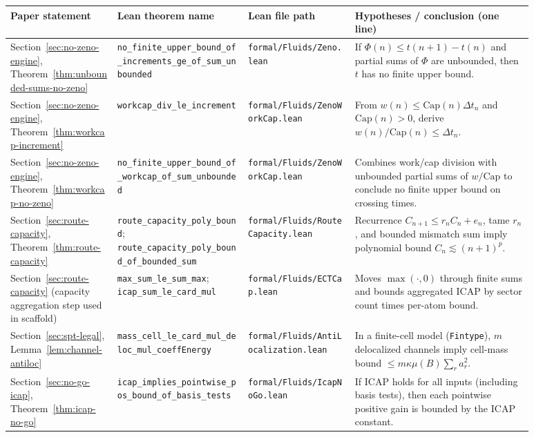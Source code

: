 \documentclass[11pt]{article}
\begin{document}
\begin{table}[H]
\centering
\footnotesize
\renewcommand{\arraystretch}{1.15}
\setlength{\tabcolsep}{4pt}
\begin{tabular}{>{\raggedright\arraybackslash}p{0.18\linewidth}
                >{\raggedright\arraybackslash}p{0.22\linewidth}
                >{\raggedright\arraybackslash}p{0.18\linewidth}
                >{\raggedright\arraybackslash}p{0.30\linewidth}}
\toprule
\textbf{Paper statement} & \textbf{Lean theorem name} & \textbf{Lean file path} & \textbf{Hypotheses / conclusion (one line)} \\
\midrule
Section~\ref{sec:no-zeno-engine}, Theorem~\ref{thm:unbounded-sums-no-zeno}
& \nolinkurl{no_finite_upper_bound_of_increments_ge_of_sum_unbounded}
& \nolinkurl{formal/Fluids/Zeno.lean}
& If \(\Phi(n)\le t(n+1)-t(n)\) and partial sums of \(\Phi\) are unbounded, then \(t\) has no finite upper bound. \\

Section~\ref{sec:no-zeno-engine}, Theorem~\ref{thm:workcap-increment}
& \nolinkurl{workcap_div_le_increment}
& \nolinkurl{formal/Fluids/ZenoWorkCap.lean}
& From \(w(n)\le \mathrm{Cap}(n)\Delta t_n\) and \(\mathrm{Cap}(n)>0\), derive \(w(n)/\mathrm{Cap}(n)\le \Delta t_n\). \\

Section~\ref{sec:no-zeno-engine}, Theorem~\ref{thm:workcap-no-zeno}
& \nolinkurl{no_finite_upper_bound_of_workcap_of_sum_unbounded}
& \nolinkurl{formal/Fluids/ZenoWorkCap.lean}
& Combines work/cap division with unbounded partial sums of \(w/\mathrm{Cap}\) to conclude no finite upper bound on crossing times. \\

Section~\ref{sec:route-capacity}, Theorem~\ref{thm:route-capacity}
& \nolinkurl{route_capacity_poly_bound}; \nolinkurl{route_capacity_poly_bound_of_bounded_sum}
& \nolinkurl{formal/Fluids/RouteCapacity.lean}
& Recurrence \(C_{n+1}\le r_n C_n+e_n\), tame \(r_n\), and bounded mismatch sum imply polynomial bound \(C_n\lesssim (n+1)^p\). \\

Section~\ref{sec:route-capacity} (capacity aggregation step used in scaffold)
& \nolinkurl{max_sum_le_sum_max}; \nolinkurl{icap_sum_le_card_mul}
& \nolinkurl{formal/Fluids/ECTCap.lean}
& Moves \(\max(\cdot,0)\) through finite sums and bounds aggregated ICAP by sector count times per-atom bound. \\

Section~\ref{sec:spt-legal}, Lemma~\ref{lem:channel-antiloc}
& \nolinkurl{mass_cell_le_card_mul_deloc_mul_coeffEnergy}
& \nolinkurl{formal/Fluids/AntiLocalization.lean}
& In a finite-cell model (\texttt{Fintype}), \(m\) delocalized channels imply cell-mass bound \(\le m\kappa\mu(B)\sum_r a_r^2\). \\

Section~\ref{sec:no-go-icap}, Theorem~\ref{thm:icap-no-go}
& \nolinkurl{icap_implies_pointwise_pos_bound_of_basis_tests}
& \nolinkurl{formal/Fluids/IcapNoGo.lean}
& If ICAP holds for all inputs (including basis tests), then each pointwise positive gain is bounded by the ICAP constant. \\
\bottomrule
\end{tabular}
\end{table}
\end{document}
